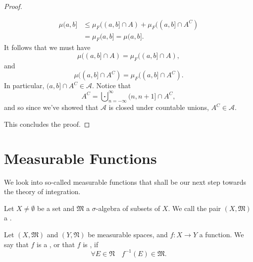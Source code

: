 \documentclass[notoc,notitlepage]{tufte-book}
\begin{document}
\begin{proof}
\begin{itemize}
\begin{align*}
        \mu(a, b] &\leq \mu_F( (a, b] \cap A ) + \mu_F( (a, b] \cap A^C ) \\
                  &= \mu_F(a, b] = \mu(a, b].
      \end{align*}
      It follows that we must have
      \begin{equation*}
        \mu( (a, b] \cap A ) = \mu_F( (a, b] \cap A ),
      \end{equation*}
      and
      \begin{equation*}
        \mu( (a, b] \cap A^C ) = \mu_F( (a, b] \cap A^C ).
      \end{equation*}
      In particular, $(a, b] \cap A^C \in \mathcal{A}$.
      Notice that
      \begin{equation*}
        A^C = \bigcupdot_{n = -\infty}^{\infty} (n, n + 1] \cap A^C,
      \end{equation*}
      and so since we've showed that $\mathcal{A}$ is closed under
      countable unions, $A^C \in \mathcal{A}$.
  \end{itemize}

  This concludes the proof.
\end{proof}


\section{Measurable Functions}%
\label{sec:measurable_functions}

We look into so-called measurable functions that shall
be our next step towards the theory of integration.

\begin{defn}\label{defn:measurable_space}
  Let $X \neq \emptyset$ be a set and $\mathfrak{M}$ a $\sigma$-algebra
  of subsets of $X$.
  We call the pair $(X, \mathfrak{M})$ a .
\end{defn}

\begin{defn}\label{defn:measurable_functions}
  Let $(X, \mathfrak{M})$ and $(Y, \mathfrak{N})$ be measurable spaces,
  and $f : X \to Y$ a function.
  We say that $f$ is
  a ,
  or that $f$ is , if
  \begin{equation*}
    \forall E \in \mathfrak{N}\quad f^{-1}(E) \in \mathfrak{M}.
  \end{equation*}
\end{defn}
\end{document}
